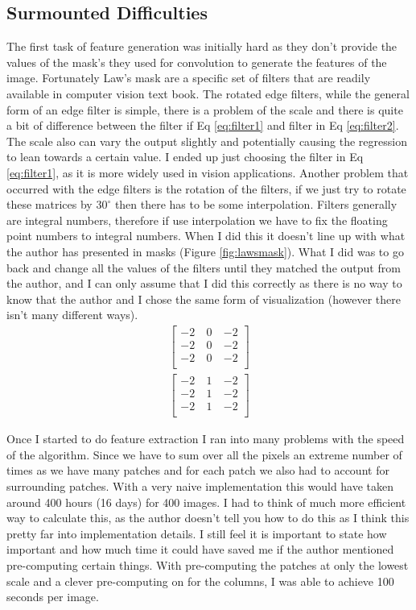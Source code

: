 \documentclass[journal]{IEEEtran}
\begin{document}
\subsection{Surmounted Difficulties}
The first task of feature generation was initially hard as they don't provide the values of the mask's they used for convolution to generate the features of the image. Fortunately Law's mask are a specific set of filters that are readily available in computer vision text book. The rotated edge filters, while the general form of an edge filter is simple, there is a problem of the scale and there is quite a bit of difference between the filter if Eq \ref{eq:filter1} and filter in Eq \ref{eq:filter2}. The scale also can vary the output slightly and potentially causing the regression to lean towards a certain value. I ended up just choosing the filter in Eq \ref{eq:filter1}, as it is more widely used in vision applications. Another problem that occurred with the edge filters is the rotation of the filters, if we just try to rotate these matrices by $30^{\circ}$ then there has to be some interpolation. Filters generally are integral numbers, therefore if use interpolation we have to fix the floating point numbers to integral numbers. When I did this it doesn't line up with what the author has presented in masks (Figure \ref{fig:lawsmask}). What I did was to go back and change all the values of the filters until they matched the output from the author, and I can only assume that I did this correctly as there is no way to know that the author and I chose the same form of visualization (however there isn't many different ways).
\begin{eqnarray}
\label{eq:filter1}
\begin{bmatrix}
	-2~&0~&-2 \\
	-2~&0~&-2 \\
	-2~&0~&-2 \\
\end{bmatrix}
\end{eqnarray}
\begin{eqnarray}
\label{eq:filter2}
\begin{bmatrix}
	-2~&1~&-2 \\
	-2~&1~&-2 \\
	-2~&1~&-2 \\
\end{bmatrix}
\end{eqnarray}

Once I started to do feature extraction I ran into many problems with the speed of the algorithm. Since we have to sum over all the pixels an extreme number of times as we have many patches and for each patch we also had to account for surrounding patches. With a very naive implementation this would have taken around 400 hours (16 days) for 400 images. I had to think of much more efficient way to calculate this, as the author doesn't tell you how to do this as I think this pretty far into implementation details. I still feel it is important to state how important and how much time it could have saved me if the author mentioned pre-computing certain things. With pre-computing the patches at only the lowest scale and a clever pre-computing on for the columns, I was able to achieve 100 seconds per image.
\end{document}
